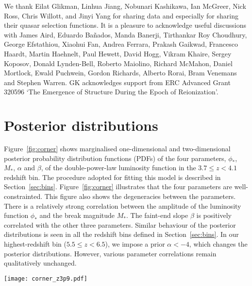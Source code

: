 \documentclass[fleqn,usenatbib]{mnras}
\begin{document}
We thank Eilat Glikman, Linhua Jiang, Nobunari Kashi\-kawa, Ian
McGreer, Nick Ross, Chris Willott, and Jinyi Yang for sharing data and
especially for sharing their quasar selection functions.  It is a
pleasure to acknowledge useful discussions with James Aird, Eduardo
Ba\~nados, Manda Banerji, Tirthankar Roy Choudhury, George Efstathiou,
Xiaohui Fan, Andrea Ferrara, Prakash Gaikwad, Francesco Haardt, Martin
Haehnelt, Paul Hewett, David Hogg, Vikram Khaire, Sergey Koposov,
Donald Lynden-Bell, Roberto Maiolino, Richard McMahon, Daniel
Mortlock, Ewald Puchwein, Gordon Richards, Alberto Rorai, Bram
Venemans and Stephen Warren.  GK acknowledges support from ERC
Advanced Grant 320596 `The Emergence of Structure During the Epoch of
Reionization'.

\appendix

\section{Posterior distributions}

Figure~\ref{fig:corner} shows marginalised one-dimensional and
two-dimensional posterior probability distribution functions (PDFs) of
the four parameters, $\phi_*$, $M_*$, $\alpha$ and $\beta$, of the
double-power-law luminosity function in the $3.7\leq z < 4.1$ redshift
bin.  The procedure adopted for fitting this model is described in
Section~\ref{sec:bins}.  Figure~\ref{fig:corner} illustrates that the
four parameters are well-constrainted.  This figure also shows the
degeneracies between the parameters.  There is a relatively strong
correlation between the amplitude of the luminosity function $\phi_*$
and the break magnitude $M_*$.  The faint-end slope $\beta$ is
positively correlated with the other three parameters.  Similar
behaviour of the posterior distributions is seen in all the redshift
bins defined in Section~\ref{sec:bins}.  In our highest-redshift bin
($5.5\leq z < 6.5$), we impose a prior $\alpha < -4$, which changes
the posterior distributions.  However, various parameter correlations
remain qualitatively unchanged.

\begin{figure*}
  \begin{center}
    \texttt{[image: corner\_z3p9.pdf]}
  \end{center}
  \caption{Posterior distributions of the four double-power-law
    parameters in the $3.7\leq z < 4.1$ redshift bin.  The blue
    squares indicate median values.  Similar behaviour of the
    posterior distributions is seen in all other redshift bins defined
    in Section~\ref{sec:bins}.
    \label{fig:corner}}
\end{figure*}
\end{document}
